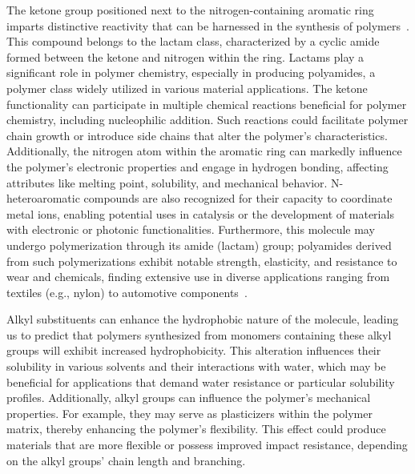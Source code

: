 The ketone group positioned next to the nitrogen-containing aromatic ring imparts distinctive reactivity that can be harnessed in the synthesis of polymers~\cite{McQuarrieSimonPhysicalChemistry,CareySundbergAdvancedOrganicChemistry,Varghese2022BeyondApplications,Varghese2022BeyondApplications}. This compound belongs to the lactam class, characterized by a cyclic amide formed between the ketone and nitrogen within the ring. Lactams play a significant role in polymer chemistry, especially in producing polyamides, a polymer class widely utilized in various material applications. The ketone functionality can participate in multiple chemical reactions beneficial for polymer chemistry, including nucleophilic addition. Such reactions could facilitate polymer chain growth or introduce side chains that alter the polymer’s characteristics. Additionally, the nitrogen atom within the aromatic ring can markedly influence the polymer’s electronic properties and engage in hydrogen bonding, affecting attributes like melting point, solubility, and mechanical behavior. N-heteroaromatic compounds are also recognized for their capacity to coordinate metal ions, enabling potential uses in catalysis or the development of materials with electronic or photonic functionalities. Furthermore, this molecule may undergo polymerization through its amide (lactam) group; polyamides derived from such polymerizations exhibit notable strength, elasticity, and resistance to wear and chemicals, finding extensive use in diverse applications ranging from textiles (e.g., nylon) to automotive components~\cite{Varghese2022BeyondApplications,Varghese2022BeyondApplications}.

Alkyl substituents can enhance the hydrophobic nature of the molecule, leading us to predict that polymers synthesized from monomers containing these alkyl groups will exhibit increased hydrophobicity. This alteration influences their solubility in various solvents and their interactions with water, which may be beneficial for applications that demand water resistance or particular solubility profiles. Additionally, alkyl groups can influence the polymer’s mechanical properties. For example, they may serve as plasticizers within the polymer matrix, thereby enhancing the polymer’s flexibility. This effect could produce materials that are more flexible or possess improved impact resistance, depending on the alkyl groups’ chain length and branching.

